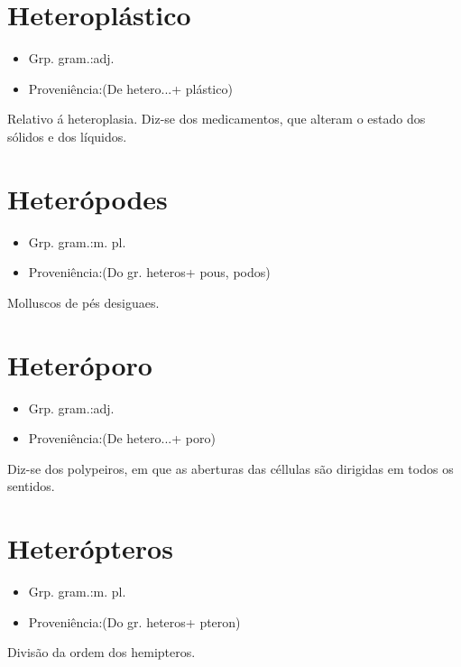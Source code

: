 \documentclass{article}
\begin{document}
\section{Heteroplástico}
\begin{itemize}
\item {Grp. gram.:adj.}
\end{itemize}
\begin{itemize}
\item {Proveniência:(De \textunderscore hetero...\textunderscore  + \textunderscore plástico\textunderscore )}
\end{itemize}
Relativo á heteroplasia.
Diz-se dos medicamentos, que alteram o estado dos sólidos e dos líquidos.
\section{Heterópodes}
\begin{itemize}
\item {Grp. gram.:m. pl.}
\end{itemize}
\begin{itemize}
\item {Proveniência:(Do gr. \textunderscore heteros\textunderscore  + \textunderscore pous\textunderscore , \textunderscore podos\textunderscore )}
\end{itemize}
Molluscos de pés desiguaes.
\section{Heteróporo}
\begin{itemize}
\item {Grp. gram.:adj.}
\end{itemize}
\begin{itemize}
\item {Proveniência:(De \textunderscore hetero...\textunderscore  + \textunderscore poro\textunderscore )}
\end{itemize}
Diz-se dos polypeiros, em que as aberturas das céllulas são dirigidas em todos os sentidos.
\section{Heterópteros}
\begin{itemize}
\item {Grp. gram.:m. pl.}
\end{itemize}
\begin{itemize}
\item {Proveniência:(Do gr. \textunderscore heteros\textunderscore  + \textunderscore pteron\textunderscore )}
\end{itemize}
Divisão da ordem dos hemipteros.
\end{document}
